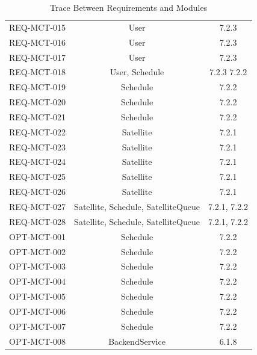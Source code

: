 \documentclass[12pt, titlepage]{article}
\begin{document}
\begin{table}[H]
\begin{tabular}{|c|c|c|}
REQ-MCT-015 & User & 7.2.3 \\ 

REQ-MCT-016 & User & 7.2.3 \\ 

REQ-MCT-017 & User & 7.2.3 \\ 

REQ-MCT-018 & User, Schedule & 7.2.3 7.2.2 \\ 

REQ-MCT-019 & Schedule & 7.2.2 \\ 

REQ-MCT-020 & Schedule & 7.2.2 \\ 

REQ-MCT-021 & Schedule & 7.2.2 \\ 

REQ-MCT-022 & Satellite & 7.2.1 \\ 

REQ-MCT-023 & Satellite & 7.2.1 \\ 

REQ-MCT-024 & Satellite & 7.2.1 \\ 

REQ-MCT-025 & Satellite & 7.2.1 \\ 

REQ-MCT-026 & Satellite & 7.2.1 \\ 

REQ-MCT-027 & Satellite, Schedule, SatelliteQueue & 7.2.1, 7.2.2 \\ 

REQ-MCT-028 & Satellite, Schedule, SatelliteQueue & 7.2.1, 7.2.2 \\ 

OPT-MCT-001 & Schedule & 7.2.2 \\ 

OPT-MCT-002 & Schedule & 7.2.2 \\ 

OPT-MCT-003 & Schedule & 7.2.2 \\ 

OPT-MCT-004 & Schedule & 7.2.2 \\ 

OPT-MCT-005 & Schedule & 7.2.2 \\ 

OPT-MCT-006 & Schedule & 7.2.2 \\ 

OPT-MCT-007 & Schedule & 7.2.2 \\ 

OPT-MCT-008 & BackendService & 6.1.8 \\

\bottomrule
\end{tabular}
\caption{Trace Between Requirements and Modules}
\label{TblRT}
\end{table}
\end{document}
